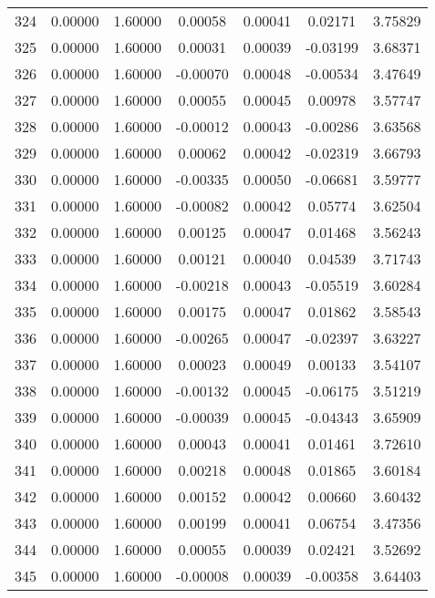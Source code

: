\begin{longtable}{c c c c c c c}
324 &  0.00000 &      1.60000 &  0.00058 &   0.00041 &   0.02171 &   3.75829 \\
325 &  0.00000 &      1.60000 &  0.00031 &   0.00039 &  -0.03199 &   3.68371 \\
326 &  0.00000 &      1.60000 & -0.00070 &   0.00048 &  -0.00534 &   3.47649 \\
327 &  0.00000 &      1.60000 &  0.00055 &   0.00045 &   0.00978 &   3.57747 \\
328 &  0.00000 &      1.60000 & -0.00012 &   0.00043 &  -0.00286 &   3.63568 \\
329 &  0.00000 &      1.60000 &  0.00062 &   0.00042 &  -0.02319 &   3.66793 \\
330 &  0.00000 &      1.60000 & -0.00335 &   0.00050 &  -0.06681 &   3.59777 \\
331 &  0.00000 &      1.60000 & -0.00082 &   0.00042 &   0.05774 &   3.62504 \\
332 &  0.00000 &      1.60000 &  0.00125 &   0.00047 &   0.01468 &   3.56243 \\
333 &  0.00000 &      1.60000 &  0.00121 &   0.00040 &   0.04539 &   3.71743 \\
334 &  0.00000 &      1.60000 & -0.00218 &   0.00043 &  -0.05519 &   3.60284 \\
335 &  0.00000 &      1.60000 &  0.00175 &   0.00047 &   0.01862 &   3.58543 \\
336 &  0.00000 &      1.60000 & -0.00265 &   0.00047 &  -0.02397 &   3.63227 \\
337 &  0.00000 &      1.60000 &  0.00023 &   0.00049 &   0.00133 &   3.54107 \\
338 &  0.00000 &      1.60000 & -0.00132 &   0.00045 &  -0.06175 &   3.51219 \\
339 &  0.00000 &      1.60000 & -0.00039 &   0.00045 &  -0.04343 &   3.65909 \\
340 &  0.00000 &      1.60000 &  0.00043 &   0.00041 &   0.01461 &   3.72610 \\
341 &  0.00000 &      1.60000 &  0.00218 &   0.00048 &   0.01865 &   3.60184 \\
342 &  0.00000 &      1.60000 &  0.00152 &   0.00042 &   0.00660 &   3.60432 \\
343 &  0.00000 &      1.60000 &  0.00199 &   0.00041 &   0.06754 &   3.47356 \\
344 &  0.00000 &      1.60000 &  0.00055 &   0.00039 &   0.02421 &   3.52692 \\
345 &  0.00000 &      1.60000 & -0.00008 &   0.00039 &  -0.00358 &   3.64403 \\

\end{longtable}
